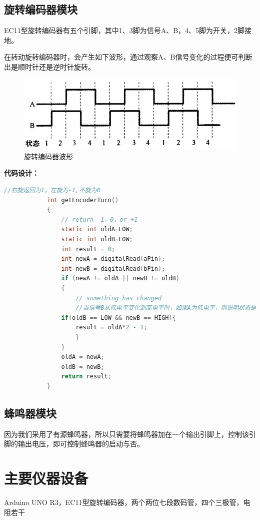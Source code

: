 \documentclass{../source/zjureport}
\begin{document}
        \subsection{旋转编码器模块}
        EC11型旋转编码器有五个引脚，其中1、3脚为信号A、B，4、5脚为开关，2脚接地。


        在转动旋转编码器时，会产生如下波形，通过观察A、B信号变化的过程便可判断出是顺时针还是逆时针旋转。
        \newpage
        \begin{figure}[thp]
            \centering
            \includegraphics{figures/旋转编码器波形.jpg}
            \caption{旋转编码器波形}
        \end{figure}
        \textbf{代码设计：}
        \begin{lstlisting}[name=旋转编码器部分代码,
            language = c
            ]
            //右旋返回为1，左旋为-1,不旋为0
            int getEncoderTurn()
            {
                // return -1，0，or +1 
                static int oldA=LOW; 
                static int oldB=LOW; 
                int result = 0;
                int newA = digitalRead(aPin);
                int newB = digitalRead(bPin);
                if (newA != oldA || newB != oldB)
                {
                    // something has changed
                    //当信号B从低电平变化到高电平时，如果A为低电平，则说明状态是从左到右变化，反之则反
                if(oldB == LOW && newB == HIGH){
                    result = oldA*2 - 1;
                    }
                }
                oldA = newA;
                oldB = newB;
                return result;
            }
        \end{lstlisting}


        \subsection{蜂鸣器模块}
        因为我们采用了有源蜂鸣器，所以只需要将蜂鸣器加在一个输出引脚上，控制该引脚的输出电压，即可控制蜂鸣器的启动与否。

    \section{主要仪器设备}
    Arduino UNO R3，EC11型旋转编码器，两个两位七段数码管，四个三极管，电阻若干
\end{document}
